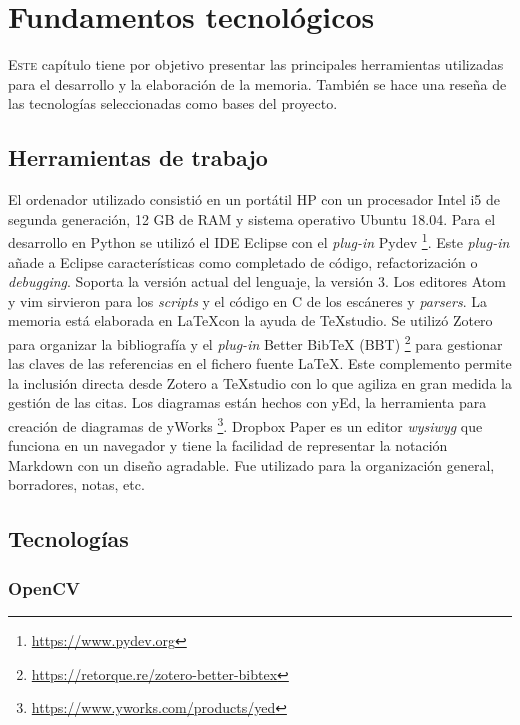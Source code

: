 
\chapter{Fundamentos tecnológicos}
\label{chap:fundamentos-tecnologicos}

\lettrine{E}{ste} capítulo tiene por objetivo presentar las principales herramientas utilizadas para el desarrollo y la elaboración de la memoria. También se hace una reseña de las tecnologías seleccionadas como bases del proyecto.

\section{Herramientas de trabajo}

El ordenador utilizado consistió en un portátil HP con un procesador Intel i5 de segunda generación, 12 GB de RAM y sistema operativo Ubuntu 18.04. Para el desarrollo en Python se utilizó el IDE Eclipse con el \emph{plug-in} Pydev
\footnote{\url{https://www.pydev.org}}. Este \emph{plug-in} añade a Eclipse características como completado de código, refactorización o \emph{debugging}. Soporta la versión actual del lenguaje, la versión 3. Los editores Atom y vim sirvieron para los \emph{scripts} y el código en C de los escáneres y \emph{parsers}. La memoria está elaborada en \LaTeX con la ayuda de TeXstudio. Se utilizó Zotero para organizar la bibliografía y el \emph{plug-in} Better BibTeX (BBT) 
\footnote{\url{https://retorque.re/zotero-better-bibtex}} para gestionar las claves de las referencias en el fichero fuente \LaTeX. Este complemento permite la inclusión directa desde Zotero a TeXstudio con lo que agiliza en gran medida la gestión de las citas. Los diagramas están hechos con yEd, la herramienta para creación de diagramas de yWorks 
\footnote{\url{https://www.yworks.com/products/yed}}. Dropbox Paper es un editor \emph{\acrlong{wysiwyg}} que funciona en un navegador y tiene la facilidad de representar la notación Markdown con un diseño agradable. Fue utilizado para la organización general, borradores, notas, etc.

\section{Tecnologías}

\subsection{OpenCV}


